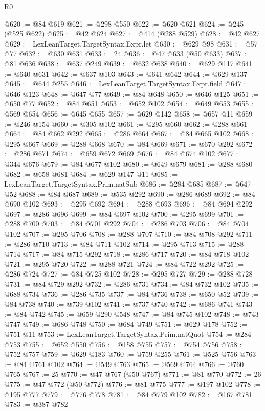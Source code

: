 \begin{lexlean}{R0}
\begin{coremodule}
@620 := @84 @619
@621 := @298 @550
@622 := @620 @621
@624 := @245 (@525 @622)
@625 := @42 @624
@627 := @414 (@288 @529)
@628 := @42 @627
@629 := LexLeanTarget.TargetSyntax.Expr.let
@630 := @629 @98
@631 := @57 @77
@632 := @630 @631
@633 := 24
@636 := @47 @633 (@50 @633)
@637 := @81 @636
@638 := @637 @249
@639 := @632 @638
@640 := @629 @117
@641 := @640 @631
@642 := @637 @103
@643 := @641 @642
@644 := @629 @137
@645 := @644 @255
@646 := LexLeanTarget.TargetSyntax.Expr.field
@647 := @646 @123
@648 := @647 @77
@649 := @84 @648
@650 := @646 @125
@651 := @650 @77
@652 := @84 @651
@653 := @652 @102
@654 := @649 @653
@655 := @569 @654
@656 := @645 @655
@657 := @629 @142
@658 := @657 @11
@659 := @246 @154
@660 := @305 @102
@661 := @295 @660
@662 := @288 @661
@664 := @84 @662 @292
@665 := @286 @664
@667 := @84 @665 @102
@668 := @295 @667
@669 := @288 @668
@670 := @84 @669
@671 := @670 @292
@672 := @286 @671
@674 := @659 @672 @669
@676 := @84 @674 @102
@677 := @344 @676
@679 := @84 @677 @102
@680 := @649 @679
@681 := @288 @680
@682 := @658 @681
@684 := @629 @147 @11
@685 := LexLeanTarget.TargetSyntax.Prim.natSub
@686 := @284 @685
@687 := @647 @52
@688 := @84 @687
@689 := @535 @292
@690 := @286 @689
@692 := @84 @690 @102
@693 := @295 @692
@694 := @288 @693
@696 := @84 @694 @292
@697 := @286 @696
@699 := @84 @697 @102
@700 := @295 @699
@701 := @288 @700
@703 := @84 @701 @292
@704 := @286 @703
@706 := @84 @704 @102
@707 := @295 @706
@708 := @288 @707
@710 := @84 @708 @292
@711 := @286 @710
@713 := @84 @711 @102
@714 := @295 @713
@715 := @288 @714
@717 := @84 @715 @292
@718 := @286 @717
@720 := @84 @718 @102
@721 := @295 @720
@722 := @288 @721
@724 := @84 @722 @292
@725 := @286 @724
@727 := @84 @725 @102
@728 := @295 @727
@729 := @288 @728
@731 := @84 @729 @292
@732 := @286 @731
@734 := @84 @732 @102
@735 := @688 @734
@736 := @286 @735
@737 := @84 @736
@738 := @650 @52
@739 := @84 @738
@740 := @739 @102
@741 := @737 @740
@742 := @686 @741
@743 := @84 @742
@745 := @659 @290 @548
@747 := @84 @745 @102
@748 := @743 @747
@749 := @686 @748
@750 := @684 @749
@751 := @629 @178
@752 := @751 @11
@753 := LexLeanTarget.TargetSyntax.Prim.natQuot
@754 := @284 @753
@755 := @652 @550
@756 := @158 @755
@757 := @754 @756
@758 := @752 @757
@759 := @629 @183
@760 := @759 @255
@761 := @525 @756
@763 := @84 @761 @102
@764 := @549 @763
@765 := @569 @764
@766 := @760 @765
@767 := 25
@770 := @47 @767 (@50 @767)
@771 := @81 @770
@772 := 26
@775 := @47 @772 (@50 @772)
@776 := @81 @775
@777 := @197 @102
@778 := @195 @777
@779 := @776 @778
@781 := @84 @779 @102
@782 := @167 @781
@783 := @387 @782

\end{coremodule}
\end{lexlean}
